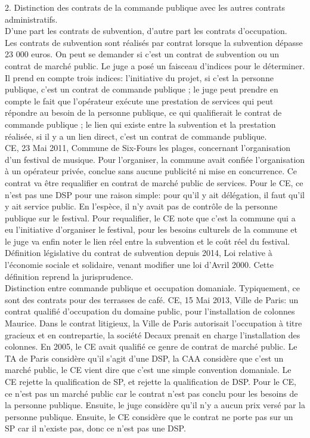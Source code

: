 \documentclass[10pt, a4paper, openany]{book}
\begin{document}
2. Distinction des contrats de la commande publique avec les autres contrats administratifs. \\
D'une part les contrats de subvention, d'autre part les contrats d'occupation. \\
Les contrats de subvention sont réalisés par contrat lorsque la subvention dépasse 23 000 euros. On peut se demander si c'est un contrat de subvention ou un contrat de marché public. Le juge a posé un faisceau d'indices pour le déterminer. Il prend en compte trois indices: l'initiative du projet, si c'est la personne publique, c'est un contrat de commande publique ; le juge peut prendre en compte le fait que l'opérateur exécute une prestation de services qui peut répondre au besoin de la personne publique, ce qui qualifierait le contrat de commande publique ; le lien qui existe entre la subvention et la prestation réalisée, si il y a un lien direct, c'est un contrat de commande publique.  \\
CE, 23 Mai 2011, Commune de Six-Fours les plages, concernant l'organisation d'un festival de musique. Pour l'organiser, la commune avait confiée l'organisation à un opérateur privée, conclue sans aucune publicité ni mise en concurrence. Ce contrat va être requalifier en contrat de marché public de services. Pour le CE, ce n'est pas une DSP pour une raison simple: pour qu'il y ait délégation, il faut qu'il y ait service public. En l'espèce, il n'y avait pas de contrôle de la personne publique sur le festival. Pour requalifier, le CE note que c'est la commune qui a eu l'initiative d'organiser le festival, pour les besoins culturels de la commune et le juge va enfin noter le lien réel entre la subvention et le coût réel du festival. \\
Définition législative du contrat de subvention depuis 2014, Loi relative à l'économie sociale et solidaire, venant modifier une loi d'Avril 2000. Cette définition reprend la jurisprudence. \\
Distinction entre commande publique et occupation domaniale. Typiquement, ce sont des contrats pour des terrasses de café. CE, 15 Mai 2013, Ville de Paris: un contrat qualifié d'occupation du domaine public, pour l'installation de colonnes Maurice. Dans le contrat litigieux, la Ville de Paris autorisait l'occupation à titre gracieux et en contrepartie, la société Decaux prenait en charge l'installation des colonnes. En 2005, le CE avait qualifié ce genre de contrat de marché public. Le TA de Paris considère qu'il s'agit d'une DSP, la CAA considère que c'est un marché public, le CE vient dire que c'est une simple convention domaniale. Le CE rejette la qualification de SP, et rejette la qualification de DSP. Pour le CE, ce n'est pas un marché public car le contrat n'est pas conclu pour les besoins de la personne publique. Ensuite, le juge considère qu'il n'y a aucun prix versé par la personne publique. Ensuite, le CE considère que le contrat ne porte pas sur un SP car il n'existe pas, donc ce n'est pas une DSP. 
\end{document}
